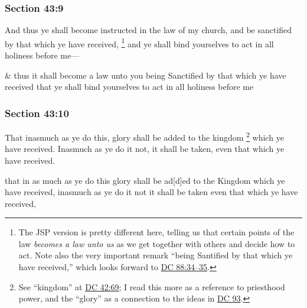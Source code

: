 	\subsubsection{Section 43:9} %
		\label{DC43-9}

		And thus ye shall become instructed in the law of my church, and be sanctified by that which ye have received,%
			\footnote{%
				The JSP version is pretty different here, telling us that certain points of the law \textit{becomes a law unto us} as we get together with others and decide how to act. Note also the very important remark ``being Santified by that which ye have received,'' which looks forward to \hyperref[DC88-34]{DC 88:34--35}.
				}
		and ye shall bind yourselves to act in all holiness before me---

		\begin{framed}
		\scriptsize
			\begin{compactdesc}
				\item[JSP] \& thus it shall become a law unto you being Sanctified by that which ye have received that ye shall bind yourselves to act in all holiness before me
			\end{compactdesc}
		\end{framed}

	\subsubsection{Section 43:10} %
		\label{DC43-10}

		That inasmuch as ye do this, glory shall be added to the kingdom%
			\footnote{%
				See ``kingdom'' at \hyperref[DC42-69]{DC 42:69}; I read this more as a reference to priesthood power, and the ``glory'' as a connection to the ideas in \hyperref[DC93]{DC 93}.
				}
		which ye have received.  Inasmuch as ye do it not, it shall be taken, even that which ye have received.

		\begin{framed}
		\scriptsize
			\begin{compactdesc}
				\item[JSP] that in as much as ye do this glory shall be ad[d]ed to the Kingdom which ye have received, inasmuch as ye do it not it shall be taken even that which ye have received,
			\end{compactdesc}
		\end{framed}

